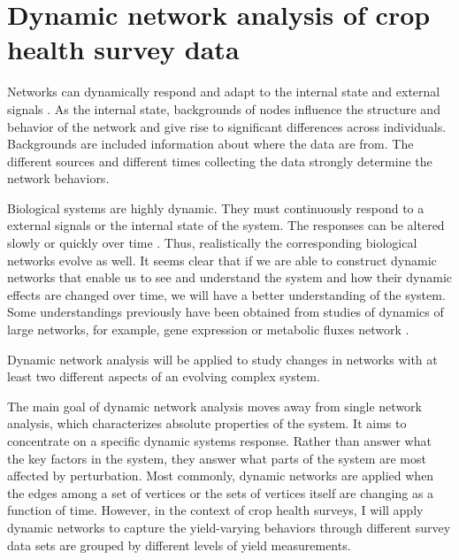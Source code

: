 \section*{Dynamic network analysis of crop health survey data}

Networks can dynamically respond and adapt to the internal state and external signals . As the internal state, backgrounds of nodes influence the structure and behavior of the network and give rise to significant differences across individuals. Backgrounds are included information about where the data are from. The different sources and different times collecting the data strongly determine the network behaviors. 


Biological systems are highly dynamic. They must continuously respond to a external signals or the internal state of the system. The responses can be altered slowly or quickly over time . Thus, realistically the corresponding biological networks evolve as well.  It seems clear that if we are able to construct dynamic networks that enable us to see and understand the system and how their dynamic effects are changed over time, we will have a better understanding of the system. Some understandings previously have been obtained from studies of dynamics of large networks, for example, gene expression or metabolic fluxes network .
 
Dynamic network analysis will be applied to study changes in networks with at least two different aspects of an evolving complex system. 

The main goal of dynamic network analysis moves away from single network analysis, which characterizes absolute properties of the system. It aims to concentrate on a specific dynamic systems response. Rather than answer what the key factors in the system, they answer what parts of the system are most affected by perturbation. Most commonly, dynamic networks are applied when the edges among a set of vertices or the sets of vertices itself are changing as a function of time. However, in the context of crop health surveys, I will apply dynamic networks to capture the yield-varying behaviors through different survey data sets are grouped by different levels of yield measurements.

